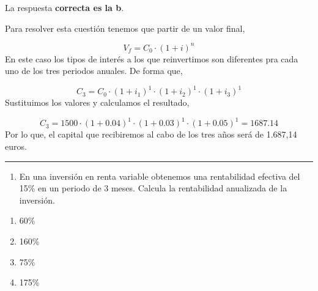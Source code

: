 \documentclass[
  letterpaper,
  DIV=11,
  numbers=noendperiod]{scrreprt}
\providecommand{\tightlist}{%
  \setlength{\itemsep}{0pt}\setlength{\parskip}{0pt}}\usepackage{longtable,booktabs,array}
\begin{document}
\begin{tcolorbox}[enhanced jigsaw, left=2mm, opacityback=0, colback=white, breakable, arc=.35mm, bottomrule=.15mm, rightrule=.15mm, toprule=.15mm, leftrule=.75mm, colframe=quarto-callout-tip-color-frame]
\begin{minipage}[t]{5.5mm}
\textcolor{quarto-callout-tip-color}{\faLightbulb}
\end{minipage}%
\begin{minipage}[t]{\textwidth - 5.5mm}

La respuesta \textbf{correcta es la b}.

Para resolver esta cuestión tenemos que partir de un valor final,

\[V_f=C_0\cdot\left(1+i\right)^n\] En este caso los tipos de interés a
los que reinvertimos son diferentes pra cada uno de los tres periodos
anuales. De forma que,

\[C_3=C_0\cdot\left(1+i_1\right)^1\cdot\left(1+i_2\right)^1\cdot\left(1+i_3\right)^1\]
Sustituimos los valores y calculamos el resultado,

\[C_3=1500\cdot\left(1+0.04\right)^1\cdot\left(1+0.03\right)^1\cdot\left(1+0.05\right)^1=1687.14\]
Por lo que, el capital que recibiremos al cabo de los tres años será de
1.687,14 euros.

\end{minipage}%
\end{tcolorbox}

\begin{center}\rule{0.5\linewidth}{0.5pt}\end{center}

\begin{enumerate}
\def\labelenumi{\arabic{enumi}.}
\setcounter{enumi}{14}
\tightlist
\item
  En una inversión en renta variable obtenemos una rentabilidad efectiva
  del 15\% en un periodo de 3 meses. Calcula la rentabilidad anualizada
  de la inversión.
\end{enumerate}

\begin{enumerate}
\def\labelenumi{\alph{enumi})}
\item
  60\%
\item
  160\%
\item
  75\%
\item
  175\%
\end{enumerate}
\end{document}

